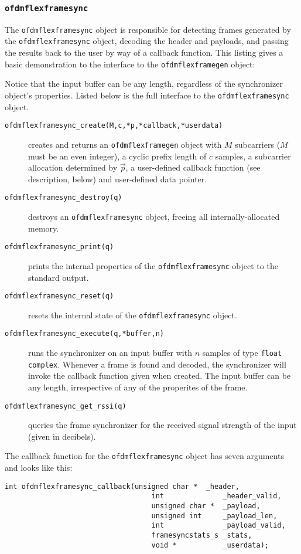\subsubsection{{\tt ofdmflexframesync}}
\label{module:framing:ofdmflexframe:sync}
%
The {\tt ofdmflexframesync} object is responsible for detecting frames
generated by the {\tt ofdmflexframesync} object, decoding the header and
payloads, and passing the results back to the user by way of a callback
function.
%
This listing gives a basic demonstration to the interface to the
{\tt ofdmflexframegen} object:
%

%
Notice that the input buffer can be any length, regardless of the
synchronizer object's properties.
Listed below is the full interface to the {\tt ofdmflexframesync}
object.
%
\begin{description}
%
\item[{\tt ofdmflexframesync\_create(M,c,*p,*callback,*userdata)}]
    creates and returns an {\tt ofdmflexframegen} object
    with $M$ subcarriers ($M$ must be an even integer),
    a cyclic prefix length of $c$ samples,
    a subcarrier allocation determined by $\vec{p}$,
    a user-defined callback function (see description, below)
    and user-defined data pointer.
%
\item[{\tt ofdmflexframesync\_destroy(q)}]
    destroys an {\tt ofdmflexframesync} object, freeing all
    internally-allocated memory.
%
\item[{\tt ofdmflexframesync\_print(q)}]
    prints the internal properties of the {\tt ofdmflexframesync}
    object to the standard output.
%
\item[{\tt ofdmflexframesync\_reset(q)}]
    resets the internal state of the {\tt ofdmflexframesync} object.
%
\item[{\tt ofdmflexframesync\_execute(q,*buffer,n)}]
    runs the synchronizer on an input buffer with $n$ samples of type
    {\tt float complex}.
    Whenever a frame is found and decoded, the synchronizer will invoke
    the callback function given when created.
    The input buffer can be any length, irrespective of any of the
    properites of the frame.
%
\item[{\tt ofdmflexframesync\_get\_rssi(q)}]
    queries the frame synchronizer for the received signal strength of
    the input (given in decibels).
%
\end{description}
%
%
%
The callback function for the {\tt ofdmflexframesync} object has seven
arguments and looks like this:
%
\begin{Verbatim}[fontsize=\small]
    int ofdmflexframesync_callback(unsigned char *  _header,
                                   int              _header_valid,
                                   unsigned char *  _payload,
                                   unsigned int     _payload_len,
                                   int              _payload_valid,
                                   framesyncstats_s _stats,
                                   void *           _userdata);
\end{Verbatim}
